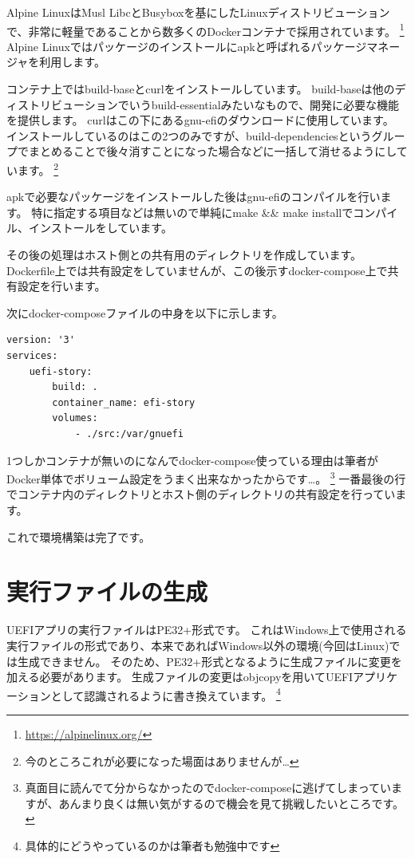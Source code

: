 \documentclass[10pt,b5paper,twoside,openany]{ltjsbook}
\begin{document}
Alpine LinuxはMusl LibcとBusyboxを基にしたLinuxディストリビューションで、非常に軽量であることから数多くのDockerコンテナで採用されています。
\footnote{\url{https://alpinelinux.org/}}
Alpine Linuxではパッケージのインストールにapkと呼ばれるパッケージマネージャを利用します。

コンテナ上ではbuild-baseとcurlをインストールしています。
build-baseは他のディストリビューションでいうbuild-essentialみたいなもので、開発に必要な機能を提供します。
curlはこの下にあるgnu-efiのダウンロードに使用しています。
インストールしているのはこの2つのみですが、build-dependenciesというグループでまとめることで後々消すことになった場合などに一括して消せるようにしています。
\footnote{今のところこれが必要になった場面はありませんが…}

apkで必要なパッケージをインストールした後はgnu-efiのコンパイルを行います。
特に指定する項目などは無いので単純にmake \&\& make installでコンパイル、インストールをしています。

その後の処理はホスト側との共有用のディレクトリを作成しています。
Dockerfile上では共有設定をしていませんが、この後示すdocker-compose上で共有設定を行います。

次にdocker-composeファイルの中身を以下に示します。
\begin{lstlisting}[caption=docker-compose,label=docker-compose]
version: '3'
services:
    uefi-story:
        build: .
        container_name: efi-story
        volumes:
            - ./src:/var/gnuefi
\end{lstlisting}
1つしかコンテナが無いのになんでdocker-compose使っている理由は筆者がDocker単体でボリューム設定をうまく出来なかったからです…。
\footnote{真面目に読んでて分からなかったのでdocker-composeに逃げてしまっていますが、あんまり良くは無い気がするので機会を見て挑戦したいところです。}    
一番最後の行でコンテナ内のディレクトリとホスト側のディレクトリの共有設定を行っています。

これで環境構築は完了です。

\section{実行ファイルの生成}
UEFIアプリの実行ファイルはPE32+形式です。
これはWindows上で使用される実行ファイルの形式であり、本来であればWindows以外の環境(今回はLinux)では生成できません。
そのため、PE32+形式となるように生成ファイルに変更を加える必要があります。
生成ファイルの変更はobjcopyを用いてUEFIアプリケーションとして認識されるように書き換えています。
\footnote{具体的にどうやっているのかは筆者も勉強中です}
\end{document}
